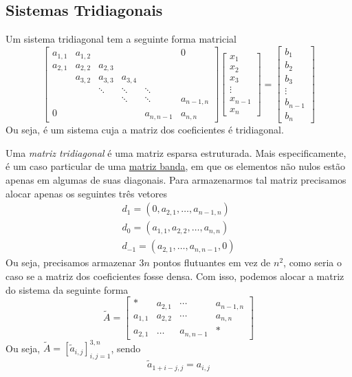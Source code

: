 \subsection{Sistemas Tridiagonais}

Um sistema tridiagonal tem a seguinte forma matricial
\begin{equation}\label{eq:sistridiag}
  \begin{bmatrix}
    a_{1,1} & a_{1,2} & & & & 0\\
    a_{2,1} & a_{2,2} & a_{2,3} & & &\\
    & a_{3,2} & a_{3,3} & a_{3,4} & &\\
    & & \ddots & \ddots & \ddots &\\
    & & & \ddots & \ddots & a_{n-1,n}\\
    0 & & & & a_{n,n-1} & a_{n,n}
  \end{bmatrix}
  \begin{bmatrix}
    x_1\\
    x_2\\
    x_3\\
    \vdots\\
    x_{n-1}\\
    x_n
  \end{bmatrix} =
    \begin{bmatrix}
    b_1\\
    b_2\\
    b_3\\
    \vdots\\
    b_{n-1}\\
    b_n
  \end{bmatrix}
\end{equation}
Ou seja, é um sistema cuja a matriz dos coeficientes é tridiagonal.

Uma \emph{matriz tridiagonal} é uma matriz esparsa estruturada. Mais especificamente, é um caso particular de uma \href{https://pt.wikipedia.org/wiki/Matriz_banda}{matriz banda}, em que os elementos não nulos estão apenas em algumas de suas diagonais. Para armazenarmos tal matriz precisamos alocar apenas os seguintes três vetores
\begin{gather}
  d_{1} = \left(0,a_{2,1},\dotsc,a_{n-1,n}\right)\\
  d_{0} = \left(a_{1,1},a_{2,2},\dotsc,a_{n,n}\right)\\
  d_{-1} = \left(a_{2,1},\dotsc,a_{n,n-1},0\right)
\end{gather}
Ou seja, precisamos armazenar $3n$ pontos flutuantes em vez de $n^2$, como seria o caso se a matriz dos coeficientes fosse densa. Com isso, podemos alocar a matriz do sistema da seguinte forma
\begin{equation}
  \tilde{A} =
  \begin{bmatrix}
    * & a_{2,1} & \cdots & a_{n-1,n}\\
    a_{1,1} & a_{2,2} & \cdots & a_{n,n}\\
    a_{2,1} & \dotsc & a_{n,n-1} & *
  \end{bmatrix}
\end{equation}
Ou seja, $\tilde{A} = [\tilde{a}_{i,j}]_{i,j=1}^{3,n}$, sendo
\begin{equation}
  \tilde{a}_{1+i-j,j} = a_{i,j}
\end{equation}

